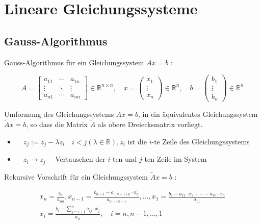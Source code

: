 \section{Lineare Gleichungssysteme}

\subsection{Gauss-Algorithmus}

Gauss-Algorithmus für ein Gleichungssystem $A x=b$ :

$$
A=\left[\begin{array}{ccc}
a_{11} & \cdots & a_{1 n} \\
\vdots & \ddots & \vdots \\
a_{n 1} & \cdots & a_{n n}
\end{array}\right] \in \mathbb{R}^{n \times n}, \quad x=\left(\begin{array}{c}
x_{1} \\
\vdots \\
x_{n}
\end{array}\right) \in \mathbb{R}^{n}, \quad b=\left(\begin{array}{c}
b_{1} \\
\vdots \\
b_{n}
\end{array}\right) \in \mathbb{R}^{n}
$$

Umformung des Gleichungssystems $A x=b$, in ein äquivalentes Gleichungssystem $\tilde{A} x=b$, so dass die Matrix $\tilde{A}$ als obere Dreiecksmatrix vorliegt.

\begin{itemize}
  \item $\quad z_{j}:=z_{j}-\lambda z_{i} \quad i<j(\lambda \in \mathbb{R}), z_{i}$ ist die $i$-te Zeile des Gleichungssystems
  \item $\quad z_{i} \rightarrow z_{j} \quad$ Vertauschen der $i$-ten und $j$-ten Zeile im System
\end{itemize}

Rekursive Vorschrift für ein Gleichungssystem $\tilde{A} x=b$ :

$$
\begin{gathered}
x_{n}=\frac{b_{n}}{a_{n n}}, x_{n-1}=\frac{b_{n-1}-a_{(n-1) n} \cdot x_{n}}{a_{n-1 n-1}}, \ldots, x_{1}=\frac{b_{1}-a_{12} \cdot x_{2}-\cdots-a_{1 n} \cdot x_{n}}{a_{11}} \\
x_{i}=\frac{b_{i}-\sum_{j=i+1}^{n} a_{i j} \cdot x_{j}}{a_{i i}}, \quad i=n, n-1, \ldots, 1
\end{gathered}
$$


